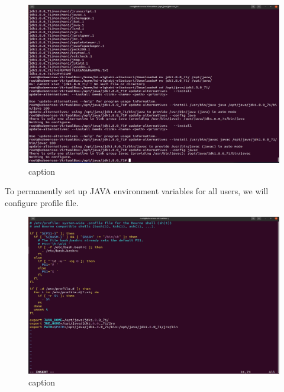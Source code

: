 \begin{spacing}{1.2}
\begin{figure}[!htb] 
\begin{center} 
\includegraphics[width=1\linewidth]{Big_Data/Hadoop/Apache Hadoop Installation/Installing java and javac.jpg} 
\end{center} 
\caption{caption} 
\end{figure} 
\FloatBarrier


\par To permanently set up JAVA environment variables for all users, we will configure profile file.
\\
\begin{figure}[!htb] 
\begin{center} 
\includegraphics[width=1\linewidth]{Big_Data/Hadoop/Apache Hadoop Installation/profile file config.jpg} 
\end{center} 
\caption{caption} 
\end{figure} 
\FloatBarrier


\end{spacing}
